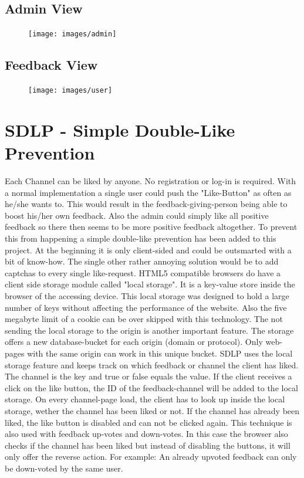 \subsection{Admin View}
 \begin{figure}[H]
  \label{observer}
    \texttt{[image: images/admin]}
\end{figure}
\subsection{Feedback View}
\begin{figure}[H]
  \label{observer}
    \texttt{[image: images/user]}
\end{figure}
\section{SDLP - Simple Double-Like Prevention}
Each Channel can be liked by anyone. No registration or log-in is required. With a normal implementation a single user could push the "Like-Button" as often as he/she wants to. This would result in the feedback-giving-person being able to  boost his/her own feedback. Also the admin could simply like all positive feedback so there then seems to be more positive feedback altogether. To prevent this from happening a simple double-like prevention has been added to this project. At the beginning it is only client-sided and could be outsmarted with a bit of know-how. The single other rather annoying solution would be to add captchas to every single like-request. 
HTML5 compatible browsers do have a client side storage module called "local storage". It is a key-value store inside the browser of the accessing device. This local storage was designed to hold a large number of keys without affecting the performance of the website. Also the five megabyte limit of a cookie can be  over skipped with  this technology. 
The not sending the local storage  to the origin is another important feature. 
The storage offers a new database-bucket for each origin (domain or protocol). Only web-pages with the same origin can work in this unique bucket. 
SDLP uses the local storage feature and keeps track on which feedback or channel the client has liked. The channel is the key and true or false equals the value. If the client receives a click on the like button, the ID of the feedback-channel will be added to the local storage. On every channel-page load, the client has to look up inside the local storage, wether the channel has been liked or not. If the channel has already been liked, the like button is disabled and can not be clicked again. 
This technique is also used with feedback up-votes and down-votes. In this case the browser also checks if the channel has been liked but instead of disabling the buttons, it will only offer the reverse action. 
For example: An already upvoted feedback can only be down-voted by the same user.

